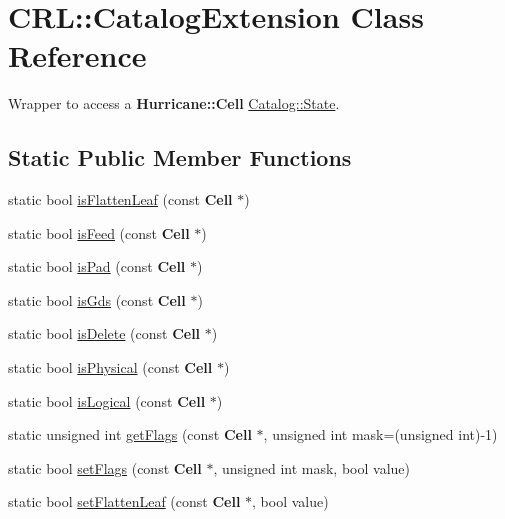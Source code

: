 \hypertarget{classCRL_1_1CatalogExtension}{\section{C\-R\-L\-:\-:Catalog\-Extension Class Reference}
\label{classCRL_1_1CatalogExtension}
}


Wrapper to access a {\bf Hurricane\-::\-Cell} \hyperlink{classCRL_1_1Catalog_1_1State}{Catalog\-::\-State}.  


\subsection*{Static Public Member Functions}
\begin{DoxyCompactItemize}
\item 
static bool \hyperlink{classCRL_1_1CatalogExtension_af6487fb6007e34163773d8e8d15013a1}{is\-Flatten\-Leaf} (const {\bf Cell} $\ast$)
\item 
static bool \hyperlink{classCRL_1_1CatalogExtension_a5feda5d6fba490a71e3742361ec7b4a1}{is\-Feed} (const {\bf Cell} $\ast$)
\item 
static bool \hyperlink{classCRL_1_1CatalogExtension_a2695acabeac2f224fa4ac3a9563aeee9}{is\-Pad} (const {\bf Cell} $\ast$)
\item 
static bool \hyperlink{classCRL_1_1CatalogExtension_a37c8d304e7386ee31b73c826cb929e5f}{is\-Gds} (const {\bf Cell} $\ast$)
\item 
static bool \hyperlink{classCRL_1_1CatalogExtension_a90e941d2349f5a0f4f7fefb41b434b0a}{is\-Delete} (const {\bf Cell} $\ast$)
\item 
static bool \hyperlink{classCRL_1_1CatalogExtension_a3af53ef4a7fa512a079adbcb68677e2f}{is\-Physical} (const {\bf Cell} $\ast$)
\item 
static bool \hyperlink{classCRL_1_1CatalogExtension_a558c506a28d2230e592080dccbcca380}{is\-Logical} (const {\bf Cell} $\ast$)
\item 
static unsigned int \hyperlink{classCRL_1_1CatalogExtension_a56af8791146665dab3f0f0f33317ac82}{get\-Flags} (const {\bf Cell} $\ast$, unsigned int mask=(unsigned int)-\/1)
\item 
static bool \hyperlink{classCRL_1_1CatalogExtension_ab9475735032d500f4d4a8cf980864b3e}{set\-Flags} (const {\bf Cell} $\ast$, unsigned int mask, bool value)
\item 
static bool \hyperlink{classCRL_1_1CatalogExtension_a00772e9c455d0e44caf132ee724b958d}{set\-Flatten\-Leaf} (const {\bf Cell} $\ast$, bool value)

\end{DoxyCompactItemize}
